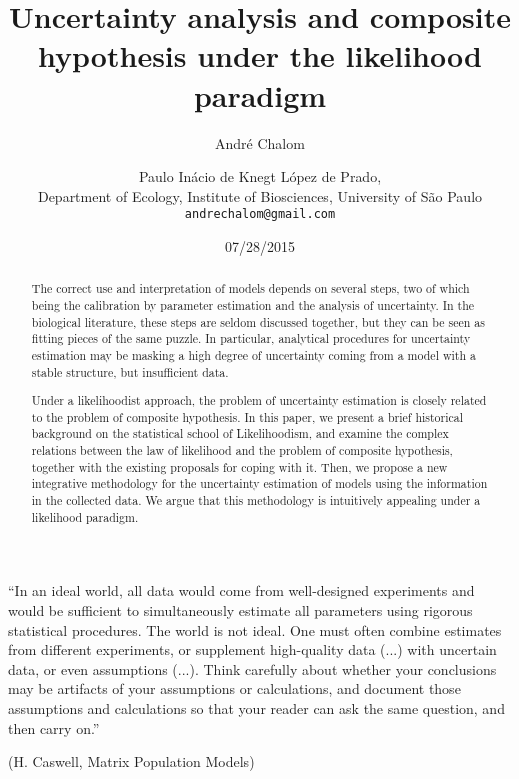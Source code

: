 \documentclass[twoside,12pt,a4paper]{article}
\begin{document}

\title{Uncertainty analysis and composite hypothesis under the likelihood paradigm}
\author{Andr\'e Chalom \and Paulo In\'acio de Knegt L\'opez de Prado,\\ 
  Department of Ecology, Institute of Biosciences, University of São Paulo \\
  \texttt{andrechalom@gmail.com}
  }
\date{07/28/2015}
\maketitle

\begin{abstract}
  The correct use and interpretation of models depends on several steps, two of which being the
  calibration by parameter estimation and the analysis of uncertainty. In the biological literature,
  these steps are seldom discussed together, but they can be seen as fitting pieces of the same puzzle.
  In particular, analytical procedures for uncertainty estimation may be masking a high degree of 
  uncertainty coming from a model with a stable structure, but insufficient data. 
  
  Under a likelihoodist approach, the problem of uncertainty estimation is closely related to the problem
  of composite hypothesis. In this paper, we present a brief historical background on the statistical 
  school of Likelihoodism, and examine the complex relations between the law of likelihood and the 
  problem of composite hypothesis, together with the existing proposals for coping with it. Then, we
  propose a new integrative methodology for the uncertainty estimation of models using the information
  in the collected data. We argue that this methodology is intuitively appealing under a likelihood 
  paradigm. 
\end{abstract}

\newpage
\vfill
\noindent
``In an ideal world, all data would come from well-designed experiments
and would be sufficient to simultaneously estimate all parameters using rigorous
statistical procedures. The world is not ideal. One must often combine estimates
from different experiments, or supplement high-quality data (...) with uncertain
data, or even assumptions (...). Think carefully about whether your conclusions
may be artifacts of your assumptions or calculations, and document those assumptions
and calculations so that your reader can ask the same question, and then carry on.''
\begin{flushright}
(H. Caswell, Matrix Population Models)
\end{flushright}
\vfill
\indent
\newpage
\tableofcontents
\newpage
\end{document}
